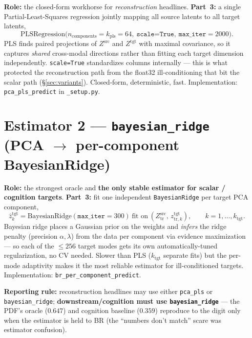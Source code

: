 \documentclass[11pt]{article}
\newcommand{\code}[1]{\texttt{#1}}
\begin{document}
\textbf{Role:} the closed-form workhorse for \emph{reconstruction} headlines.
\textbf{Part~3:} a single Partial-Least-Squares regression jointly mapping all source latents to
all target latents,
\[
  \mathrm{PLSRegression}\big(n_{\mathrm{components}}=k_{\mathrm{pls}}=64,\ \texttt{scale=True},\ \texttt{max\_iter}=2000\big).
\]
PLS finds paired projections of $Z^{\mathrm{src}}$ and $Z^{\mathrm{tgt}}$ with maximal covariance,
so it captures \emph{shared} cross-modal directions rather than fitting each target dimension
independently. \texttt{scale=True} standardizes columns internally --- this is what protected the
reconstruction path from the float32 ill-conditioning that bit the scalar path (\S\ref{sec:variants}).
Closed-form, deterministic, fast. Implementation: \code{pca\_pls\_predict} in \code{\_setup.py}.

\section{Estimator 2 --- \code{bayesian\_ridge} (PCA $\to$ per-component BayesianRidge)}\label{sec:br}

\textbf{Role:} the strongest oracle and \textbf{the only stable estimator for scalar / cognition
targets}. \textbf{Part~3:} fit one independent \texttt{BayesianRidge} per target PCA component,
\[
  \hat z^{\mathrm{tgt}}_{k} = \mathrm{BayesianRidge}(\texttt{max\_iter}{=}300)\ \text{fit on}\
  (Z^{\mathrm{src}}_{\mathrm{tr}},\, z^{\mathrm{tgt}}_{\mathrm{tr},k}),
  \qquad k = 1,\dots,k_{\mathrm{tgt}}.
\]
Bayesian ridge places a Gaussian prior on the weights and \emph{infers} the ridge penalty
(precision $\alpha,\lambda$) from the data per component via evidence maximization --- so each of
the $\le256$ target modes gets its own automatically-tuned regularization, no CV needed. Slower
than PLS ($k_{\mathrm{tgt}}$ separate fits) but the per-mode adaptivity makes it the most reliable
estimator for ill-conditioned targets. Implementation: \code{br\_per\_component\_predict}.

\medskip\noindent\textbf{Reporting rule:} reconstruction headlines may use either \code{pca\_pls}
or \code{bayesian\_ridge}; \textbf{downstream/cognition must use \code{bayesian\_ridge}} --- the
PDF's oracle ($0.647$) and cognition baseline ($0.359$) reproduce to the digit only when the
estimator is held to BR (the ``numbers don't match'' scare was estimator confusion).
\end{document}
